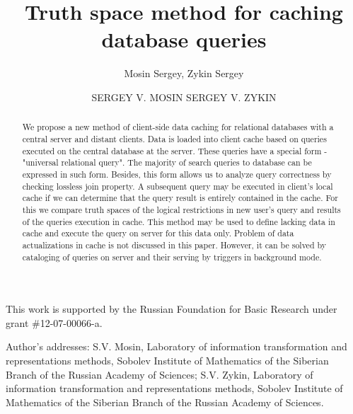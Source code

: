 \documentclass[prodmode,acmtods]{acmsmall} %
\author{Mosin Sergey, Zykin Sergey}
\begin{document}

\title{Truth space method for caching database queries}
\author{SERGEY V. MOSIN
SERGEY V. ZYKIN
}

\begin{abstract}
We propose a new method of client-side data caching for relational databases
with a central server and distant clients. Data is loaded into client cache
based on queries executed on the central database at the server. These
queries have a special form - "universal relational query". The majority of
search queries to database can be expressed in such form. Besides, this form
allows us to analyze query correctness by checking lossless join property. A
subsequent query may be executed in client's local cache if we can determine
that the query result is entirely contained in the cache. For this we compare
truth spaces of the logical restrictions in new user's query and results of
the queries execution in cache. This method may be used to define lacking data
in cache and execute the query on server for this data only. Problem of data
actualizations in cache is not discussed in this paper. However, it can be
solved by cataloging of queries on server and their serving by triggers in
background mode.
\end{abstract}





\begin{bottomstuff}
This work is supported by the Russian Foundation for Basic Research under
grant \#12-07-00066-a.

Author's addresses: S.V. Mosin, Laboratory of information transformation and
representations methods, Sobolev Institute of Mathematics of the Siberian Branch
of the Russian Academy of Sciences; S.V. Zykin, Laboratory of information
transformation and representations methods, Sobolev Institute of Mathematics of
the Siberian Branch of the Russian Academy of Sciences.
\end{bottomstuff}
\end{document}
